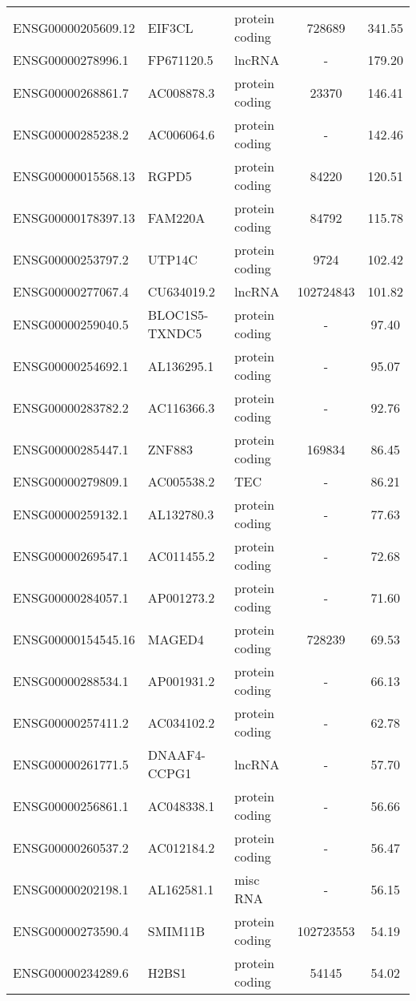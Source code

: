 \begin{longtable}[t]{lllcc}
\endfoot
\bottomrule
\endlastfoot
ENSG00000205609.12 & EIF3CL & protein coding & 728689 & 341.55\\
ENSG00000278996.1 & FP671120.5 & lncRNA & - & 179.20\\
ENSG00000268861.7 & AC008878.3 & protein coding & 23370 & 146.41\\
ENSG00000285238.2 & AC006064.6 & protein coding & - & 142.46\\
ENSG00000015568.13 & RGPD5 & protein coding & 84220 & 120.51\\
\addlinespace
ENSG00000178397.13 & FAM220A & protein coding & 84792 & 115.78\\
ENSG00000253797.2 & UTP14C & protein coding & 9724 & 102.42\\
ENSG00000277067.4 & CU634019.2 & lncRNA & 102724843 & 101.82\\
ENSG00000259040.5 & BLOC1S5-TXNDC5 & protein coding & - & 97.40\\
ENSG00000254692.1 & AL136295.1 & protein coding & - & 95.07\\
\addlinespace
ENSG00000283782.2 & AC116366.3 & protein coding & - & 92.76\\
ENSG00000285447.1 & ZNF883 & protein coding & 169834 & 86.45\\
ENSG00000279809.1 & AC005538.2 & TEC & - & 86.21\\
ENSG00000259132.1 & AL132780.3 & protein coding & - & 77.63\\
ENSG00000269547.1 & AC011455.2 & protein coding & - & 72.68\\
\addlinespace
ENSG00000284057.1 & AP001273.2 & protein coding & - & 71.60\\
ENSG00000154545.16 & MAGED4 & protein coding & 728239 & 69.53\\
ENSG00000288534.1 & AP001931.2 & protein coding & - & 66.13\\
ENSG00000257411.2 & AC034102.2 & protein coding & - & 62.78\\
ENSG00000261771.5 & DNAAF4-CCPG1 & lncRNA & - & 57.70\\
\addlinespace
ENSG00000256861.1 & AC048338.1 & protein coding & - & 56.66\\
ENSG00000260537.2 & AC012184.2 & protein coding & - & 56.47\\
ENSG00000202198.1 & AL162581.1 & misc RNA & - & 56.15\\
ENSG00000273590.4 & SMIM11B & protein coding & 102723553 & 54.19\\
ENSG00000234289.6 & H2BS1 & protein coding & 54145 & 54.02\\

\end{longtable}
